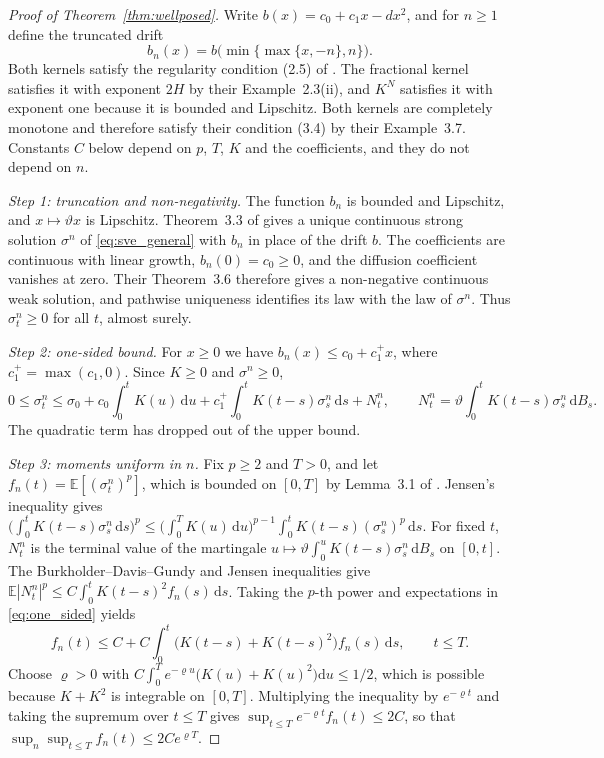 \documentclass{rQUF2e}
\theoremstyle{plain}
\theoremstyle{definition}
\theoremstyle{remark}
\newcommand{\D}{\mathrm{d}}
\newcommand{\E}{\mathbb{E}}
\begin{document}
\begin{proof}[Proof of Theorem~\ref{thm:wellposed}] Write $b(x)=c_0+c_1x-dx^2$, and for $n\ge1$ define the truncated drift
\begin{equation*}
b_n(x)=b\big(\min\{\max\{x,-n\},n\}\big).
\end{equation*}
Both kernels satisfy the regularity condition (2.5) of \citet{AbiJaberLarssonPulido2019}. The fractional kernel satisfies it with exponent $2H$ by their Example~2.3(ii), and $K^N$ satisfies it with exponent one because it is bounded and Lipschitz. Both kernels are completely monotone and therefore satisfy their condition (3.4) by their Example~3.7. Constants $C$ below depend on $p$, $T$, $K$ and the coefficients, and they do not depend on $n$.

\emph{Step 1: truncation and non-negativity.} The function $b_n$ is bounded and Lipschitz, and $x\mapsto\vartheta x$ is Lipschitz. Theorem~3.3 of \citet{AbiJaberLarssonPulido2019} gives a unique continuous strong solution $\sigma^n$ of \eqref{eq:sve_general} with $b_n$ in place of the drift $b$. The coefficients are continuous with linear growth, $b_n(0)=c_0\ge0$, and the diffusion coefficient vanishes at zero. Their Theorem~3.6 therefore gives a non-negative continuous weak solution, and pathwise uniqueness identifies its law with the law of $\sigma^n$. Thus $\sigma^n_t\ge0$ for all $t$, almost surely.

\emph{Step 2: one-sided bound.} For $x\ge0$ we have $b_n(x)\le c_0+c_1^+x$, where $c_1^+=\max(c_1,0)$. Since $K\ge0$ and $\sigma^n\ge0$,
\begin{equation}\label{eq:one_sided}
0\le\sigma^n_t\le\sigma_0+c_0\int_0^tK(u)\,\D u+c_1^+\int_0^tK(t-s)\sigma^n_s\,\D s+N^n_t,\qquad N^n_t=\vartheta\int_0^tK(t-s)\sigma^n_s\,\D B_s .
\end{equation}
The quadratic term has dropped out of the upper bound.

\emph{Step 3: moments uniform in $n$.} Fix $p\ge2$ and $T>0$, and let $f_n(t)=\E[(\sigma^n_t)^p]$, which is bounded on $[0,T]$ by Lemma~3.1 of \citet{AbiJaberLarssonPulido2019}. Jensen's inequality gives $\big(\int_0^tK(t-s)\sigma^n_s\,\D s\big)^p\le\big(\int_0^TK(u)\,\D u\big)^{p-1}\int_0^tK(t-s)(\sigma^n_s)^p\,\D s$. For fixed $t$, $N^n_t$ is the terminal value of the martingale $u\mapsto\vartheta\int_0^uK(t-s)\sigma^n_s\,\D B_s$ on $[0,t]$. The Burkholder--Davis--Gundy and Jensen inequalities give $\E|N^n_t|^p\le C\int_0^tK(t-s)^2f_n(s)\,\D s$. Taking the $p$-th power and expectations in \eqref{eq:one_sided} yields
\begin{equation*}
f_n(t)\le C+C\int_0^t\big(K(t-s)+K(t-s)^2\big)f_n(s)\,\D s,\qquad t\le T .
\end{equation*}
Choose $\varrho>0$ with $C\int_0^Te^{-\varrho u}\big(K(u)+K(u)^2\big)\D u\le1/2$, which is possible because $K+K^2$ is integrable on $[0,T]$. Multiplying the inequality by $e^{-\varrho t}$ and taking the supremum over $t\le T$ gives $\sup_{t\le T}e^{-\varrho t}f_n(t)\le2C$, so that $\sup_n\sup_{t\le T}f_n(t)\le2Ce^{\varrho T}$.


\end{proof}
\end{document}

